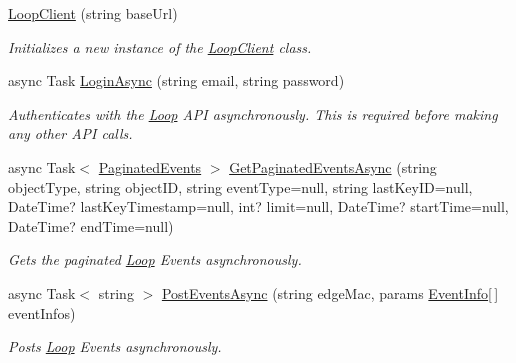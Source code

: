 \begin{DoxyCompactItemize}
\item 
\mbox{\hyperlink{class_blue_cats_1_1_loop_1_1_api_1_1_client_1_1_loop_client_aea0919a8b6c36eda28b5bfcd1f4d5a63}{Loop\+Client}} (string base\+Url)
\begin{DoxyCompactList}\small\item\em Initializes a new instance of the \mbox{\hyperlink{class_blue_cats_1_1_loop_1_1_api_1_1_client_1_1_loop_client}{Loop\+Client}} class. \end{DoxyCompactList}\item 
async Task \mbox{\hyperlink{class_blue_cats_1_1_loop_1_1_api_1_1_client_1_1_loop_client_a13bffad1550375ce8425415710dfbce1}{Login\+Async}} (string email, string password)
\begin{DoxyCompactList}\small\item\em Authenticates with the \mbox{\hyperlink{namespace_blue_cats_1_1_loop}{Loop}} A\+PI asynchronously. This is required before making any other A\+PI calls. \end{DoxyCompactList}\item 
async Task$<$ \mbox{\hyperlink{class_blue_cats_1_1_loop_1_1_api_1_1_client_1_1_models_1_1_paginated_events}{Paginated\+Events}} $>$ \mbox{\hyperlink{class_blue_cats_1_1_loop_1_1_api_1_1_client_1_1_loop_client_a405d05d5f9109565cc7657f64fe1e6ef}{Get\+Paginated\+Events\+Async}} (string object\+Type, string object\+ID, string event\+Type=null, string last\+Key\+ID=null, Date\+Time? last\+Key\+Timestamp=null, int? limit=null, Date\+Time? start\+Time=null, Date\+Time? end\+Time=null)
\begin{DoxyCompactList}\small\item\em Gets the paginated \mbox{\hyperlink{namespace_blue_cats_1_1_loop}{Loop}} Events asynchronously. \end{DoxyCompactList}\item 
async Task$<$ string $>$ \mbox{\hyperlink{class_blue_cats_1_1_loop_1_1_api_1_1_client_1_1_loop_client_af4b7413fb2769727cbc5c88b4b7f05de}{Post\+Events\+Async}} (string edge\+Mac, params \mbox{\hyperlink{class_blue_cats_1_1_loop_1_1_api_1_1_client_1_1_models_1_1_event_info}{Event\+Info}}\mbox{[}$\,$\mbox{]} event\+Infos)
\begin{DoxyCompactList}\small\item\em Posts \mbox{\hyperlink{namespace_blue_cats_1_1_loop}{Loop}} Events asynchronously. \end{DoxyCompactList}\end{DoxyCompactItemize}
